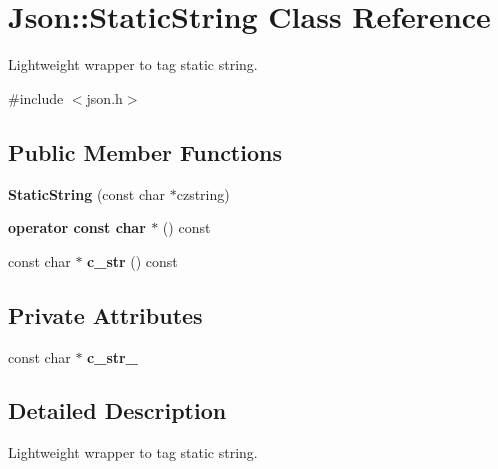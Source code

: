 \hypertarget{class_json_1_1_static_string}{}\section{Json\+:\+:Static\+String Class Reference}
\label{class_json_1_1_static_string}


Lightweight wrapper to tag static string.  




{\ttfamily \#include $<$json.\+h$>$}

\subsection*{Public Member Functions}
\begin{DoxyCompactItemize}
\item 
\hypertarget{class_json_1_1_static_string_afb6baf1ec078ce76f0b0f9b39d19437f}{}{\bfseries Static\+String} (const char $\ast$czstring)\label{class_json_1_1_static_string_afb6baf1ec078ce76f0b0f9b39d19437f}

\item 
\hypertarget{class_json_1_1_static_string_ac2b334d46bbea4c0227e508fc66433e9}{}{\bfseries operator const char $\ast$} () const \label{class_json_1_1_static_string_ac2b334d46bbea4c0227e508fc66433e9}

\item 
\hypertarget{class_json_1_1_static_string_ab86fc6a3183adf12fdba4b370acf1754}{}const char $\ast$ {\bfseries c\+\_\+str} () const \label{class_json_1_1_static_string_ab86fc6a3183adf12fdba4b370acf1754}

\end{DoxyCompactItemize}
\subsection*{Private Attributes}
\begin{DoxyCompactItemize}
\item 
\hypertarget{class_json_1_1_static_string_a9f0d9e8caee8f8db14e2c8c24760dffd}{}const char $\ast$ {\bfseries c\+\_\+str\+\_\+}\label{class_json_1_1_static_string_a9f0d9e8caee8f8db14e2c8c24760dffd}

\end{DoxyCompactItemize}


\subsection{Detailed Description}
Lightweight wrapper to tag static string. 

